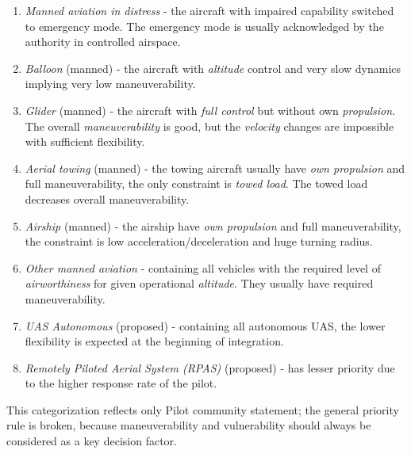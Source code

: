 \begin{enumerate}
    \item \emph{Manned aviation in distress} \cite{icaoAnnex2} -  the aircraft with impaired capability switched to emergency mode. The emergency mode is usually acknowledged by the authority in controlled airspace. 
    
    \item \emph{Balloon} (manned) \cite{icaoAnnex2} - the aircraft with \emph{altitude} control and very slow dynamics implying very low maneuverability.  
    
    \item \emph{Glider} (manned) \cite{icaoAnnex2} - the aircraft with \emph{full control} but without own \emph{propulsion}. The overall \emph{maneuverability} is good, but the \emph{velocity} changes are impossible with sufficient flexibility.
    
    \item \emph{Aerial towing} (manned) \cite{icaoAnnex2} - the towing aircraft usually have \emph{own propulsion} and full maneuverability, the only constraint is \emph{towed load}. The towed load decreases overall maneuverability.
    
    \item \emph{Airship} (manned) \cite{icaoAnnex2} - the airship have \emph{own propulsion} and full maneuverability, the constraint is low acceleration/deceleration and huge turning radius.
    
    \item \emph{Other manned aviation} \cite{icaoAnnex2} - containing all vehicles with the required level of \emph{airworthiness} for given operational \emph{altitude}. They usually have required maneuverability.
    
    \item \emph{UAS Autonomous} (proposed) \cite{santiago2015pilot} - containing all autonomous UAS, the lower flexibility is expected at the beginning of integration.
    
    \item \emph{Remotely Piloted Aerial System (RPAS)} (proposed)  \cite{santiago2015pilot} - has lesser priority due to the higher response rate of the pilot.
\end{enumerate}

\begin{note}
    This categorization reflects only Pilot community statement; the general priority rule is broken, because maneuverability and vulnerability  should always be considered as a key decision factor. 
\end{note}


